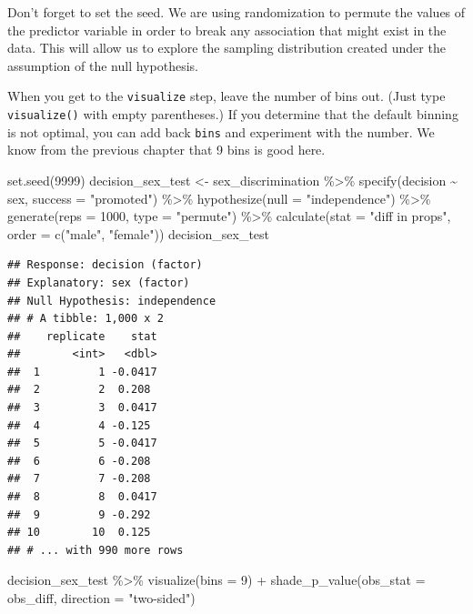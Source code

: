 \documentclass[
]{book}
\newenvironment{Shaded}{\begin{snugshade}}{\end{snugshade}}
\newcommand{\AttributeTok}[1]{\textcolor[rgb]{0.77,0.63,0.00}{#1}}
\newcommand{\DecValTok}[1]{\textcolor[rgb]{0.00,0.00,0.81}{#1}}
\newcommand{\FunctionTok}[1]{\textcolor[rgb]{0.00,0.00,0.00}{#1}}
\newcommand{\NormalTok}[1]{#1}
\newcommand{\OtherTok}[1]{\textcolor[rgb]{0.56,0.35,0.01}{#1}}
\newcommand{\SpecialCharTok}[1]{\textcolor[rgb]{0.00,0.00,0.00}{#1}}
\newcommand{\StringTok}[1]{\textcolor[rgb]{0.31,0.60,0.02}{#1}}
\begin{document}
Don't forget to set the seed. We are using randomization to permute the values of the predictor variable in order to break any association that might exist in the data. This will allow us to explore the sampling distribution created under the assumption of the null hypothesis.

When you get to the \texttt{visualize} step, leave the number of bins out. (Just type \texttt{visualize()} with empty parentheses.) If you determine that the default binning is not optimal, you can add back \texttt{bins} and experiment with the number. We know from the previous chapter that 9 bins is good here.

\begin{Shaded}
\begin{Highlighting}[]
\FunctionTok{set.seed}\NormalTok{(}\DecValTok{9999}\NormalTok{)}
\NormalTok{decision\_sex\_test }\OtherTok{\textless{}{-}}\NormalTok{ sex\_discrimination }\SpecialCharTok{\%\textgreater{}\%}
    \FunctionTok{specify}\NormalTok{(decision }\SpecialCharTok{\textasciitilde{}}\NormalTok{ sex, }\AttributeTok{success =} \StringTok{"promoted"}\NormalTok{) }\SpecialCharTok{\%\textgreater{}\%}
    \FunctionTok{hypothesize}\NormalTok{(}\AttributeTok{null =} \StringTok{"independence"}\NormalTok{) }\SpecialCharTok{\%\textgreater{}\%}
    \FunctionTok{generate}\NormalTok{(}\AttributeTok{reps =} \DecValTok{1000}\NormalTok{, }\AttributeTok{type =} \StringTok{"permute"}\NormalTok{) }\SpecialCharTok{\%\textgreater{}\%}
    \FunctionTok{calculate}\NormalTok{(}\AttributeTok{stat =} \StringTok{"diff in props"}\NormalTok{, }\AttributeTok{order =} \FunctionTok{c}\NormalTok{(}\StringTok{"male"}\NormalTok{, }\StringTok{"female"}\NormalTok{))}
\NormalTok{decision\_sex\_test}
\end{Highlighting}
\end{Shaded}

\begin{verbatim}
## Response: decision (factor)
## Explanatory: sex (factor)
## Null Hypothesis: independence
## # A tibble: 1,000 x 2
##    replicate    stat
##        <int>   <dbl>
##  1         1 -0.0417
##  2         2  0.208 
##  3         3  0.0417
##  4         4 -0.125 
##  5         5 -0.0417
##  6         6 -0.208 
##  7         7 -0.208 
##  8         8  0.0417
##  9         9 -0.292 
## 10        10  0.125 
## # ... with 990 more rows
\end{verbatim}

\begin{Shaded}
\begin{Highlighting}[]
\NormalTok{decision\_sex\_test }\SpecialCharTok{\%\textgreater{}\%}
    \FunctionTok{visualize}\NormalTok{(}\AttributeTok{bins =} \DecValTok{9}\NormalTok{) }\SpecialCharTok{+}
    \FunctionTok{shade\_p\_value}\NormalTok{(}\AttributeTok{obs\_stat =}\NormalTok{ obs\_diff, }\AttributeTok{direction =} \StringTok{"two{-}sided"}\NormalTok{)}
\end{Highlighting}
\end{Shaded}
\end{document}
